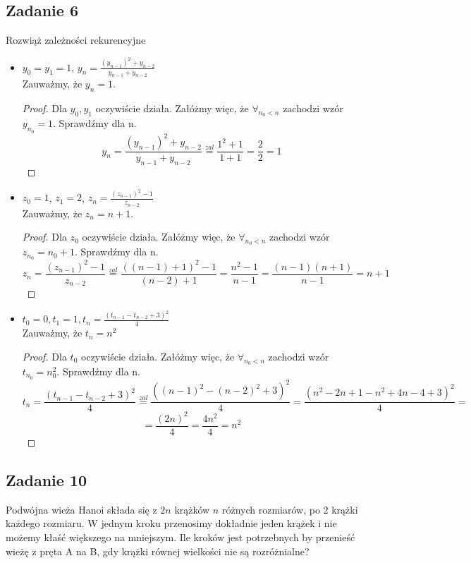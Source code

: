 \documentclass[a4paper]{article}
\begin{document}
\subsection*{Zadanie 6}
Rozwiąż zależności rekurencyjne

\begin{itemize}
\item $y_0=y_1=1$, $y_n=\frac{(y_{n-1})^2+y_{n-2}}{y_{n-1}+{y_{n-2}}}$\\
Zauważmy, że $y_n=1$.
\begin{proof}
Dla $y_0, y_1$ oczywiście działa. Załóżmy więc, że $\forall_{n_0<n}$ zachodzi wzór $y_{n_0}=1$. Sprawdźmy dla n.
$$y_n=\frac{(y_{n-1})^2+y_{n-2}}{y_{n-1}+{y_{n-2}}} \overset{zal}{=} \frac{1^2+1}{1+1}=\frac{2}{2}=1 $$
\end{proof}

\item $z_0=1$, $z_1=2$, $z_n=\frac{(z_{n-1})^2-1}{z_{n-2}}$\\
Zauważmy, że $z_n=n+1$. 
\begin{proof}
Dla $z_0$ oczywiście działa. Załóżmy więc, że $\forall_{n_0<n}$ zachodzi wzór $z_{n_0}=n_0+1$. Sprawdźmy dla n.
$$z_n=\frac{(z_{n-1})^2 - 1}{z_{n-2}} \overset{zal}{=} \frac{((n-1)+1)^2 - 1}{(n-2)+1} = \frac{n^2-1}{n-1}=\frac{(n-1)(n+1)}{n-1}=n+1$$
\end{proof}

\item $t_0=0, t_1=1, t_n=\frac{(t_{n-1}-t_{n-2}+3)^2}{4}$\\
Zauważmy, że $t_n=n^2$
\begin{proof}
Dla $t_0$ oczywiście działa.  Załóżmy więc, że $\forall_{n_0<n}$ zachodzi wzór $t_{n_0}=n_0^2$. Sprawdźmy dla n.
$$t_n=\frac{(t_{n-1}-t_{n-2}+3)^2}{4} \overset{zal}{=} \frac{((n-1)^2-(n-2)^2+3)^2}{4}=\frac{(n^2-2n+1- n^2+4n-4+3)^2}{4} = $$ $$= \frac{(2n)^2}{4} = \frac{4n^2}{4}=n^2 $$
\end{proof}

\end{itemize}

\subsection*{Zadanie 10}
Podwójna wieża Hanoi składa się z $2n$ krążków $n$ różnych rozmiarów, po $2$ krążki każdego rozmiaru. W jednym kroku przenosimy dokładnie jeden krążek i nie możemy kłaść większego na mniejszym. Ile kroków jest potrzebnych by przenieść wieżę z pręta A na B, gdy krążki równej wielkości nie są rozróżnialne?
\end{document}
